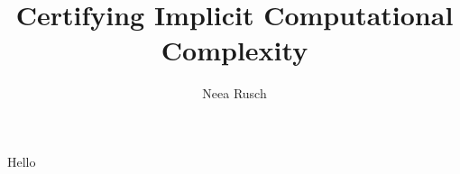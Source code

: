 \documentclass[letterpaper,11pt]{article}
\title{Certifying Implicit Computational Complexity}
\author{Neea Rusch}
\begin{document}
    Hello~\cite{Aubert2022b}
\end{document}
